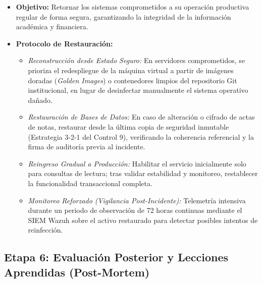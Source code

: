 \begin{itemize}
    \item \textbf{Objetivo:} Retornar los sistemas comprometidos a su operación productiva regular de forma segura, garantizando la integridad de la información académica y financiera.
    \item \textbf{Protocolo de Restauración:}
    \begin{itemize}
        \item \textit{Reconstrucción desde Estado Seguro:} En servidores comprometidos, se prioriza el redespliegue de la máquina virtual a partir de imágenes doradas (\textit{Golden Images}) o contenedores limpios del repositorio Git institucional, en lugar de desinfectar manualmente el sistema operativo dañado.
        \item \textit{Restauración de Bases de Datos:} En caso de alteración o cifrado de actas de notas, restaurar desde la última copia de seguridad inmutable (Estrategia 3-2-1 del Control 9), verificando la coherencia referencial y la firma de auditoría previa al incidente.
        \item \textit{Reingreso Gradual a Producción:} Habilitar el servicio inicialmente solo para consultas de lectura; tras validar estabilidad y monitoreo, restablecer la funcionalidad transaccional completa.
        \item \textit{Monitoreo Reforzado (Vigilancia Post-Incidente):} Telemetría intensiva durante un periodo de observación de 72 horas continuas mediante el SIEM Wazuh sobre el activo restaurado para detectar posibles intentos de reinfección.
    \end{itemize}
\end{itemize}

\subsection{Etapa 6: Evaluación Posterior y Lecciones Aprendidas (Post-Mortem)}

